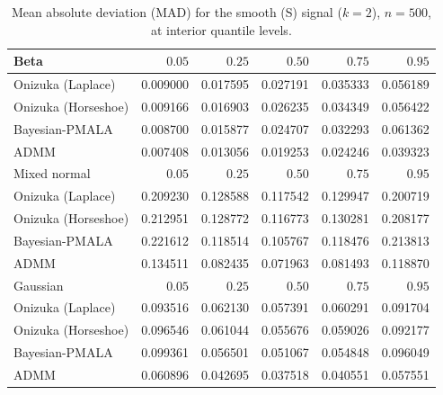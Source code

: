\begin{table}[!htbp]
\centering
\small
\caption{Mean absolute deviation (MAD) for the smooth (S) signal ($k=2$), $n=500$, at interior quantile levels.}
\label{tab:s_int_mad}
\begin{tabular}{lrrrrr}
\toprule
Beta & $0.05$ & $0.25$ & $0.50$ & $0.75$ & $0.95$ \\
\midrule
Onizuka (Laplace) & 0.009000 & 0.017595 & 0.027191 & 0.035333 & 0.056189 \\
Onizuka (Horseshoe) & 0.009166 & 0.016903 & 0.026235 & 0.034349 & 0.056422 \\
Bayesian-PMALA & 0.008700 & 0.015877 & 0.024707 & 0.032293 & 0.061362 \\
ADMM & 0.007408 & 0.013056 & 0.019253 & 0.024246 & 0.039323 \\
\midrule
Mixed normal & $0.05$ & $0.25$ & $0.50$ & $0.75$ & $0.95$ \\
\midrule
Onizuka (Laplace) & 0.209230 & 0.128588 & 0.117542 & 0.129947 & 0.200719 \\
Onizuka (Horseshoe) & 0.212951 & 0.128772 & 0.116773 & 0.130281 & 0.208177 \\
Bayesian-PMALA & 0.221612 & 0.118514 & 0.105767 & 0.118476 & 0.213813 \\
ADMM & 0.134511 & 0.082435 & 0.071963 & 0.081493 & 0.118870 \\
\midrule
Gaussian & $0.05$ & $0.25$ & $0.50$ & $0.75$ & $0.95$ \\
\midrule
Onizuka (Laplace) & 0.093516 & 0.062130 & 0.057391 & 0.060291 & 0.091704 \\
Onizuka (Horseshoe) & 0.096546 & 0.061044 & 0.055676 & 0.059026 & 0.092177 \\
Bayesian-PMALA & 0.099361 & 0.056501 & 0.051067 & 0.054848 & 0.096049 \\
ADMM & 0.060896 & 0.042695 & 0.037518 & 0.040551 & 0.057551 \\
\bottomrule
\end{tabular}
\end{table}

